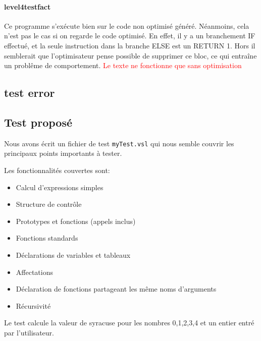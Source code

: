 \documentclass{article}
\begin{document}
\paragraph{level4testfact}

Ce programme s'exécute bien sur le code non optimisé généré. Néanmoins, cela
n'est pas le cas si on regarde le code optimisé. En effet, il y a un branchement
IF effectué, et la seule instruction dans la branche ELSE est un RETURN 1. Hors
il semblerait que l'optimisateur pense possible de supprimer ce bloc, ce qui
entraîne un problême de comportement. \textcolor{red}{Le texte ne fonctionne que sans optimisation}

\subsection{test error}

\subsection{Test proposé}

Nous avons écrit un fichier de test \texttt{myTest.vsl} qui nous
semble couvrir les principaux points importants à tester.

Les fonctionnalités couvertes sont:
\begin{itemize}
\item Calcul d'expressions simples
\item Structure de contrôle
\item Prototypes et fonctions (appels inclus)
\item Fonctions standards
\item Déclarations de variables et tableaux
\item Affectations
\item Déclaration de fonctions partageant les même noms d'arguments
\item Récursivité
\end{itemize}

Le test calcule la valeur de syracuse pour les nombres 0,1,2,3,4 et un entier entré par l'utilisateur.
\end{document}
